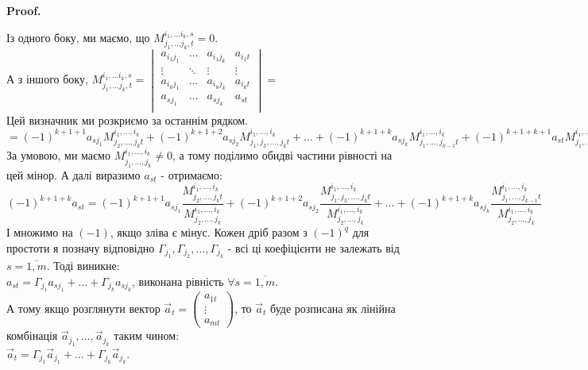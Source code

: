 \documentclass[a4paper, 10pt]{article}
\makeatletter
\theoremstyle{theoremdd}
\renewenvironment{proof}[1][Proof.\\]{\par
\pushQED{\hfill \qed}%
\normalfont \topsep6\p@\@plus6\p@\relax
\trivlist
\item\relax
{\bfseries
#1\@addpunct{.}}\hspace\labelsep\ignorespaces
}{%
\popQED\endtrivlist\@endpefalse
}
\makeatother
\begin{document}
\begin{proof}
Із одного боку, ми маємо, що $M_{j_1,\dots j_k,t}^{i_1, \dots i_k,s} = 0$.\\
А з іншого боку, $M_{j_1,\dots j_k,t}^{i_1, \dots i_k,s} = \begin{vmatrix}
a_{i_1 j_1} & \dots & a_{i_1 j_k} & a_{i_1 t} \\
\vdots & \ddots & \vdots & \vdots \\
a_{i_k j_1} & \dots & a_{i_k j_k} & a_{i_k t} \\
a_{s j_1} & \dots & a_{s j_k} & a_{s t} \\
\end{vmatrix} \boxed{=}$\\
Цей визначник ми розкриємо за останнім рядком.\\
$\boxed{=} (-1)^{k+1+1} a_{sj_1} M_{j_2,\dots,j_k t}^{i_1,\dots,i_k} + (-1)^{k+1+2} a_{sj_2} M_{j_1,j_3,\dots,j_k t}^{i_1,\dots,i_k} + \dots + (-1)^{k+1+k} a_{sj_k}M_{j_1,\dots,j_{k-1} t}^{i_1,\dots,i_k} + (-1)^{k+1+k+1}a_{st} M_{j_1,\dots,j_k}^{i_1,\dots,i_k}$\\
За умовою, ми маємо $M_{j_1,\dots,j_k}^{i_1,\dots,i_k} \neq 0$, а тому поділимо обидві частини рівності на цей мінор. А далі виразимо $a_{st}$ - отримаємо:\\
$(-1)^{k+1+k}a_{st} = (-1)^{k+1+1} a_{sj_1} \dfrac{M_{j_2,\dots,j_k t}^{i_1,\dots,i_k}}{M_{j_2,\dots,j_k}^{i_1,\dots,i_k}}  + (-1)^{k+1+2} a_{sj_2} \dfrac{M_{j_1,j_3,\dots,j_k t}^{i_1,\dots,i_k}}{M_{j_2,\dots,j_k}^{i_1,\dots,i_k}} + \dots + (-1)^{k+1+k} a_{sj_k} \dfrac{M_{j_1,\dots,j_{k-1} t}^{i_1,\dots,i_k}}{M_{j_2,\dots,j_k}^{i_1,\dots,i_k}}$\\
І множимо на $(-1)$, якщо зліва є мінус. Кожен дріб разом з $(-1)^q$ для простоти я позначу відповідно $\Gamma_{j_1}, \Gamma_{j_2},\dots,\Gamma_{j_k}$ - всі ці коефіцієнти не залежать від $s = \overline{1,m}$. Тоді виникне:\\
$a_{st} = \Gamma_{j_1} a_{sj_1} + \dots + \Gamma_{j_k} a_{sj_k}$, виконана рівність $\forall s = \overline{1,m}$. \\
А тому якщо розглянути вектор $\vec{a}_t = \begin{pmatrix}
a_{1t} \\ \vdots \\ a_{mt}
\end{pmatrix}$, то $\vec{a}_t$ буде розписана як лінійна комбінація $\vec{a}_{j_1},\dots,\vec{a}_{j_k}$ таким чином:\\
$\vec{a}_t = \Gamma_{j_1} \vec{a}_{j_1} + \dots + \Gamma_{j_k} \vec{a}_{j_k}$.\\

\end{proof}
\end{document}
